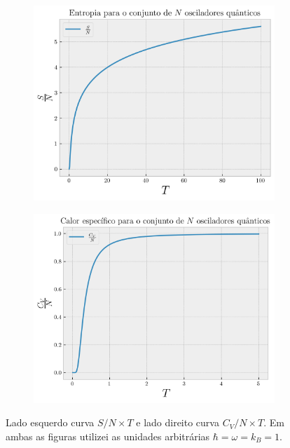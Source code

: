 \documentclass[a4paper,10pt]{article}
\begin{document}
\begin{figure}[H]
\centering
\begin{subfigure}{.46\textwidth}
  \centering
  \includegraphics[width=0.95\linewidth]{fig/entropia_quant-osc.png}
  \label{fig:entropia_qosc}
\end{subfigure}
\begin{subfigure}{.46\textwidth}
  \centering
  \includegraphics[width=0.95\linewidth]{fig/cv_quant-osc.png}
  \label{fig:cv_qosc}
\end{subfigure}
\label{fig:qosc}
\caption{Lado esquerdo curva $S/N \times T$ e lado direito curva $C_V/N \times T$. Em ambas as figuras utilizei as unidades arbitrárias $\hbar = \omega = k_B = 1$.}
\end{figure}
\end{document}
